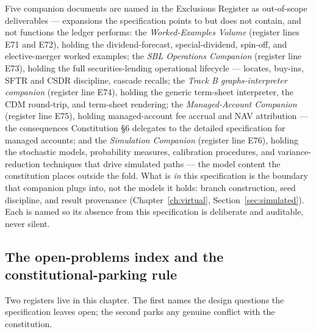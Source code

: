 Five companion documents are named in the Exclusions Register as out-of-scope
deliverables --- expansions the specification points to but does not contain, and not
functions the ledger performs: the \emph{Worked-Examples Volume} (register lines E71 and
E72), holding the dividend-forecast, special-dividend, spin-off, and elective-merger
worked examples; the \emph{SBL Operations Companion} (register line E73), holding the full
securities-lending operational lifecycle --- locates, buy-ins, SFTR and CSDR discipline,
cascade recalls; the \emph{Track B graphs-interpreter companion} (register line E74),
holding the generic term-sheet interpreter, the CDM round-trip, and term-sheet rendering;
the \emph{Managed-Account Companion} (register line E75), holding managed-account fee
accrual and NAV attribution --- the consequences Constitution \S6 delegates to the detailed
specification for managed accounts; and the \emph{Simulation Companion} (register line
E76), holding the stochastic models, probability measures, calibration procedures, and
variance-reduction techniques that drive simulated paths --- the model content the
constitution places outside the fold. What is \emph{in} this specification is the boundary
that companion plugs into, not the models it holds: branch construction, seed discipline,
and result provenance (Chapter~\ref{ch:virtual}, Section~\ref{sec:simulated}). Each is
named so its absence from this specification is deliberate and auditable, never silent.

\subsection{The open-problems index and the constitutional-parking rule}

Two registers live in this chapter. The first names the design questions the specification
leaves open; the second parks any genuine conflict with the constitution.

